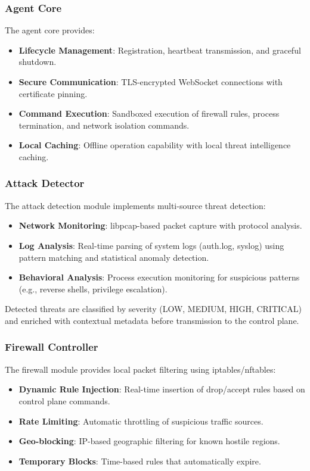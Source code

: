 \subsubsection{Agent Core}

The agent core provides:
\begin{itemize}
    \item \textbf{Lifecycle Management}: Registration, heartbeat transmission, and graceful shutdown.
    \item \textbf{Secure Communication}: TLS-encrypted WebSocket connections with certificate pinning.
    \item \textbf{Command Execution}: Sandboxed execution of firewall rules, process termination, and network isolation commands.
    \item \textbf{Local Caching}: Offline operation capability with local threat intelligence caching.
\end{itemize}

\subsubsection{Attack Detector}

The attack detection module implements multi-source threat detection:
\begin{itemize}
    \item \textbf{Network Monitoring}: libpcap-based packet capture with protocol analysis.
    \item \textbf{Log Analysis}: Real-time parsing of system logs (auth.log, syslog) using pattern matching and statistical anomaly detection.
    \item \textbf{Behavioral Analysis}: Process execution monitoring for suspicious patterns (e.g., reverse shells, privilege escalation).
\end{itemize}

Detected threats are classified by severity (LOW, MEDIUM, HIGH, CRITICAL) and enriched with contextual metadata before transmission to the control plane.

\subsubsection{Firewall Controller}

The firewall module provides local packet filtering using iptables/nftables:
\begin{itemize}
    \item \textbf{Dynamic Rule Injection}: Real-time insertion of drop/accept rules based on control plane commands.
    \item \textbf{Rate Limiting}: Automatic throttling of suspicious traffic sources.
    \item \textbf{Geo-blocking}: IP-based geographic filtering for known hostile regions.
    \item \textbf{Temporary Blocks}: Time-based rules that automatically expire.
\end{itemize}


